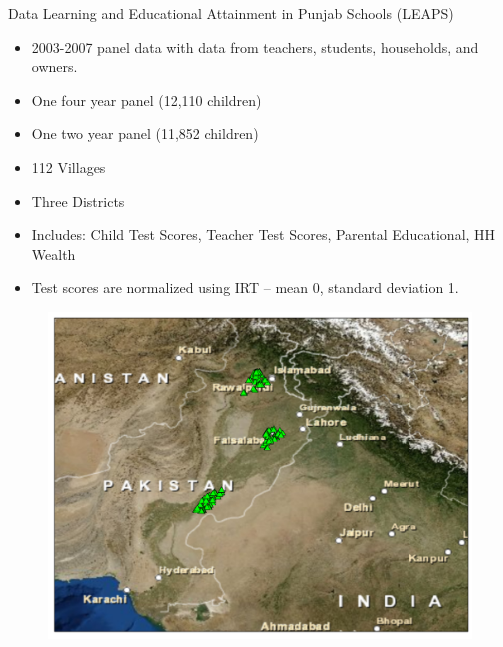 \documentclass{beamer}
\begin{document}
\begin{frame}{Data}	
Learning and Educational Attainment in Punjab Schools (LEAPS)
\begin{itemize}
	\item 2003-2007 panel data with data from teachers, students, households, and owners.
	\item One four year panel (12,110 children)
	\item One two year panel (11,852 children)
	\item 112 Villages
	\item Three Districts
	\item Includes: Child Test Scores, Teacher Test Scores, Parental Educational, HH Wealth
	\item Test scores are normalized using IRT -- mean 0, standard deviation 1.
\end{itemize}
\end{frame}

\begin{frame}{}
	\begin{figure}[htb]
		\begin{center}
		\includegraphics[scale=0.4]{maps/hh_map_allpak.pdf}
		\end{center}
	\end{figure}
\end{frame}
\end{document}

